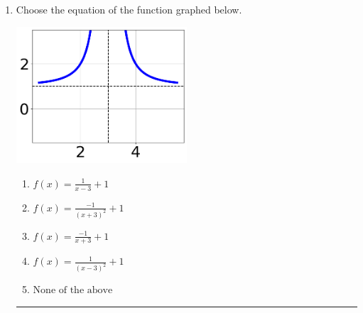 \documentclass[14pt]{extbook}
\newcommand{\litem}[1]{\item#1\hspace*{-1cm}\rule{\textwidth}{0.4pt}}
\begin{document}
\begin{enumerate}
{\begin{enumerate}[label=\Alph*.]
\end{enumerate} }
\litem{
Choose the equation of the function graphed below.
\begin{center}
    \includegraphics[width=0.5\textwidth]{../Figures/rationalGraphToEquationCopyB.png}
\end{center}
\begin{enumerate}[label=\Alph*.]
\item \( f(x) = \frac{1}{x - 3} + 1 \)
\item \( f(x) = \frac{-1}{(x + 3)^2} + 1 \)
\item \( f(x) = \frac{-1}{x + 3} + 1 \)
\item \( f(x) = \frac{1}{(x - 3)^2} + 1 \)
\item \( \text{None of the above} \)


\end{enumerate}}
\end{enumerate}
\end{document}
